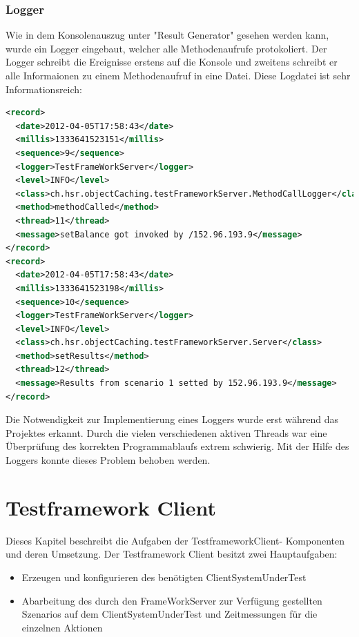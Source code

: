 \subsubsection{Logger}
\label{sec:logger}
Wie in dem Konsolenauszug unter "Result Generator" gesehen werden kann, wurde ein Logger eingebaut, welcher alle Methodenaufrufe protokoliert. Der Logger schreibt die Ereignisse erstens auf die Konsole und zweitens schreibt er alle Informaionen zu einem Methodenaufruf in eine Datei. Diese Logdatei ist sehr Informationsreich:

\begin{lstlisting}[language=XML, breaklines=true]
<record>
  <date>2012-04-05T17:58:43</date>
  <millis>1333641523151</millis>
  <sequence>9</sequence>
  <logger>TestFrameWorkServer</logger>
  <level>INFO</level>
  <class>ch.hsr.objectCaching.testFrameworkServer.MethodCallLogger</class>
  <method>methodCalled</method>
  <thread>11</thread>
  <message>setBalance got invoked by /152.96.193.9</message>
</record>
<record>
  <date>2012-04-05T17:58:43</date>
  <millis>1333641523198</millis>
  <sequence>10</sequence>
  <logger>TestFrameWorkServer</logger>
  <level>INFO</level>
  <class>ch.hsr.objectCaching.testFrameworkServer.Server</class>
  <method>setResults</method>
  <thread>12</thread>
  <message>Results from scenario 1 setted by 152.96.193.9</message>
</record>
\end{lstlisting}

Die Notwendigkeit zur Im\-pl\-emen\-tie\-rung eines Log\-gers wurde erst wäh\-rend das Projektes erkannt. Durch die vielen verschiedenen aktiven Threads war eine Überprüfung des korrekten Programmablaufs extrem schwierig. Mit der Hilfe des Loggers konnte dieses Problem behoben werden.

\section{Testframework Client}
\label{sec:test-FW Client}
Dieses Kapi\-tel beschreibt die Aufgaben der TestframeworkClient- Komponenten und deren Umsetzung. Der Testframework Client besitzt zwei Hauptaufgaben:
\begin{itemize}
\item Erzeugen und konfigurieren des benötigten ClientSystemUnderTest
\item Abarbeitung des durch den FrameWorkServer zur Verfügung gestellten Szenarios auf dem ClientSystemUnderTest und Zeitmessungen für die einzelnen Aktionen
\end{itemize}

